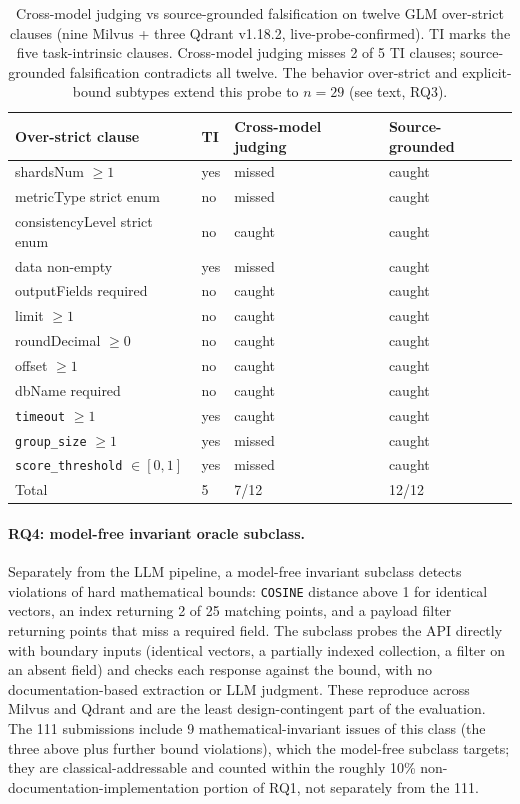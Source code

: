 \documentclass[sigconf]{acmart}
\begin{document}
\begin{table}[t]
\caption{Cross-model judging vs source-grounded falsification on twelve GLM over-strict clauses (nine Milvus + three Qdrant v1.18.2, live-probe-confirmed). TI marks the five task-intrinsic clauses. Cross-model judging misses 2 of 5 TI clauses; source-grounded falsification contradicts all twelve. The behavior over-strict and explicit-bound subtypes extend this probe to $n{=}29$ (see text, RQ3).}
\label{tab:e2}
\small
\begin{tabular}{@{}lp{}p{}p{}@{}}
\toprule
Over-strict clause & TI & Cross-model judging & Source-grounded \\
\midrule
shardsNum $\geq 1$ & yes & missed & caught \\
metricType strict enum & no & missed & caught \\
consistencyLevel strict enum & no & caught & caught \\
data non-empty & yes & missed & caught \\
outputFields required & no & caught & caught \\
limit $\geq 1$ & no & caught & caught \\
roundDecimal $\geq 0$ & no & caught & caught \\
offset $\geq 1$ & no & caught & caught \\
dbName required & no & caught & caught \\
\midrule
\texttt{timeout} $\geq 1$ & yes & caught & caught \\
\texttt{group\_size} $\geq 1$ & yes & missed & caught \\
\texttt{score\_threshold} $\in[0,1]$ & yes & missed & caught \\
\midrule
Total & 5 & 7/12 & 12/12 \\
\bottomrule
\end{tabular}
\end{table}

\paragraph{RQ4: model-free invariant oracle subclass.}
Separately from the LLM pipeline, a model-free invariant subclass detects violations of hard mathematical bounds: \texttt{COSINE} distance above 1 for identical vectors, an index returning 2 of 25 matching points, and a payload filter returning points that miss a required field. The subclass probes the API directly with boundary inputs (identical vectors, a partially indexed collection, a filter on an absent field) and checks each response against the bound, with no documentation-based extraction or LLM judgment. These reproduce across Milvus and Qdrant and are the least design-contingent part of the evaluation. The 111 submissions include 9 mathematical-invariant issues of this class (the three above plus further bound violations), which the model-free subclass targets; they are classical-addressable and counted within the roughly 10\% non-documentation-implementation portion of RQ1, not separately from the 111.
\end{document}
